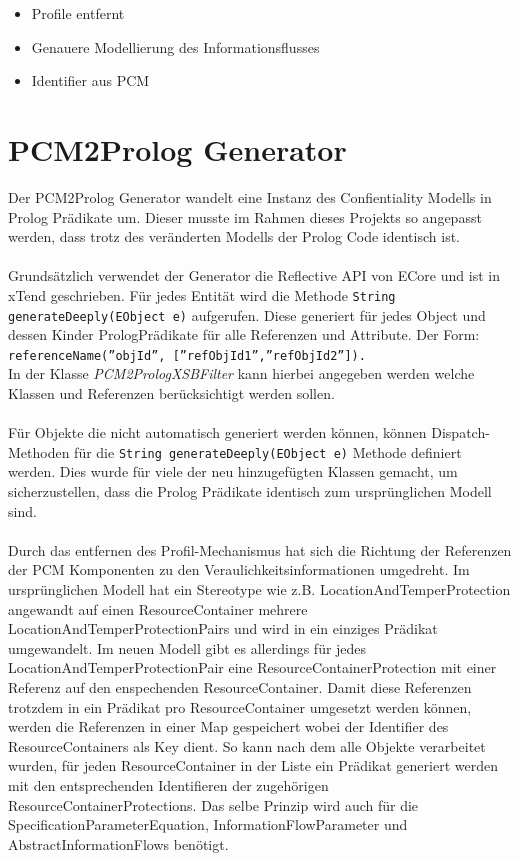 \documentclass[twoside, ngerman]{sdqseminar}
\begin{document}
\begin{itemize}
	\item Profile entfernt
	\item Genauere Modellierung des Informationsflusses
	\item Identifier aus PCM
\end{itemize}


\section{PCM2Prolog Generator}
Der PCM2Prolog Generator wandelt eine Instanz des Confientiality Modells in Prolog Prädikate um. Dieser musste im Rahmen dieses Projekts so angepasst werden, dass trotz des veränderten Modells der Prolog Code identisch ist. \\ \\
Grundsätzlich verwendet der Generator die Reflective API von ECore und ist in xTend geschrieben. Für jedes Entität wird die Methode \texttt{String generateDeeply(EObject e)} aufgerufen. Diese generiert für jedes Object und dessen Kinder PrologPrädikate für alle Referenzen und Attribute. Der Form:
\texttt{referenceName(''objId'', [''refObjId1'',''refObjId2'']).} \\ In der Klasse \textit{PCM2PrologXSBFilter} kann hierbei angegeben werden welche Klassen und Referenzen berücksichtigt werden sollen. \\ \\
Für Objekte die nicht automatisch generiert werden können, können Dispatch-Methoden für die  \texttt{String generateDeeply(EObject e)} Methode definiert werden. Dies wurde für viele der neu hinzugefügten Klassen gemacht, um sicherzustellen, dass die Prolog Prädikate identisch zum ursprünglichen Modell sind.\\ \\
Durch das entfernen des Profil-Mechanismus hat sich die Richtung der Referenzen der PCM Komponenten zu den Veraulichkeitsinformationen umgedreht. Im ursprünglichen Modell hat ein Stereotype wie z.B. LocationAndTemperProtection angewandt auf einen ResourceContainer mehrere LocationAndTemperProtectionPairs und wird in ein einziges Prädikat umgewandelt. Im neuen Modell gibt es allerdings für jedes LocationAndTemperProtectionPair eine ResourceContainerProtection mit einer Referenz auf den enspechenden ResourceContainer. Damit diese Referenzen trotzdem in ein Prädikat pro ResourceContainer umgesetzt werden können, werden die Referenzen in einer Map gespeichert wobei der Identifier des ResourceContainers als Key dient. So kann nach dem alle Objekte verarbeitet wurden, für jeden ResourceContainer in der Liste ein Prädikat generiert werden mit den entsprechenden Identifieren der zugehörigen ResourceContainerProtections. Das selbe Prinzip wird auch für die SpecificationParameterEquation, InformationFlowParameter und AbstractInformationFlows benötigt.
\end{document}
